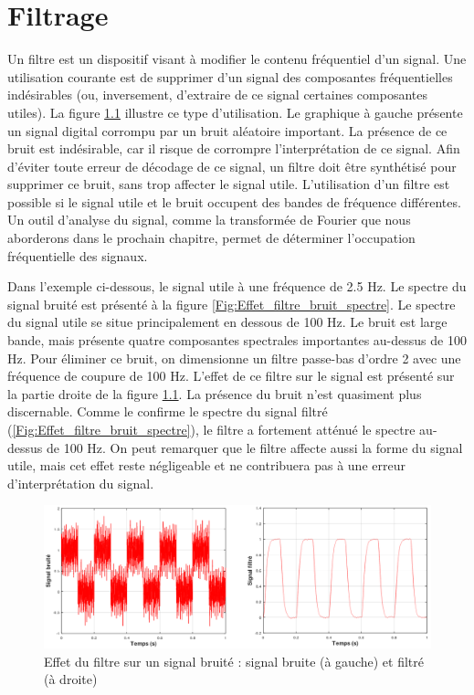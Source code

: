\chapter{Filtrage}

	Un filtre est un dispositif visant à modifier le contenu fréquentiel d'un signal. Une utilisation courante est de supprimer d'un signal des composantes fréquentielles indésirables (ou, inversement, d'extraire de ce signal certaines composantes utiles). La figure \ref{Fig:Effet_filtre_bruit} illustre ce type d'utilisation. Le graphique à gauche présente un signal digital corrompu par un bruit aléatoire important. La présence de ce bruit est indésirable, car il risque de corrompre l'interprétation de ce signal. Afin d'éviter toute erreur de décodage de ce signal, un filtre doit être synthétisé pour supprimer ce bruit, sans trop affecter le signal utile. L'utilisation d'un filtre est possible si le signal utile et le bruit occupent des bandes de fréquence différentes. Un outil d'analyse du signal, comme la transformée de Fourier que nous aborderons dans le prochain chapitre, permet de déterminer l'occupation fréquentielle des signaux.
	
	Dans l'exemple ci-dessous, le signal utile à une fréquence de 2.5 Hz. Le spectre du signal bruité est présenté à la figure \ref{Fig:Effet_filtre_bruit_spectre}. Le spectre du signal utile se situe principalement en dessous de 100 Hz. Le bruit est large bande, mais présente quatre composantes spectrales importantes au-dessus de 100 Hz. Pour éliminer ce bruit, on dimensionne un filtre passe-bas d'ordre 2 avec une fréquence de coupure de 100 Hz. L'effet de ce filtre sur le signal est présenté sur la partie droite de la figure \ref{Fig:Effet_filtre_bruit}. La présence du bruit n'est quasiment plus discernable. Comme le confirme le spectre du signal filtré (\ref{Fig:Effet_filtre_bruit_spectre}), le filtre a fortement atténué le spectre au-dessus de 100 Hz. On peut remarquer que le filtre affecte aussi la forme du signal utile, mais cet effet reste négligeable et ne contribuera pas à une erreur d'interprétation du signal.  
	
	\begin{figure}[h]
		\centering
		\includegraphics[scale=0.6]{images/Effet_filtre_bruit.png}
		\caption{Effet du filtre sur un signal bruité : signal bruite (à gauche) et filtré (à droite)}	
		\label{Fig:Effet_filtre_bruit} 
	\end{figure}

